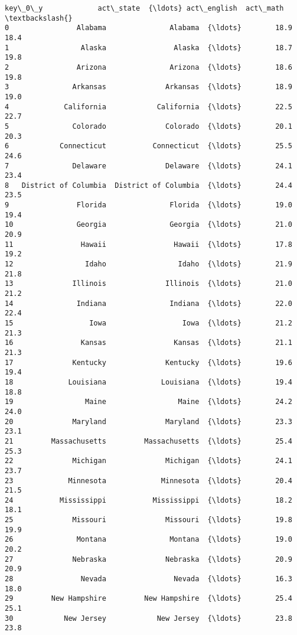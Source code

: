 \documentclass[11pt]{article}
\begin{document}
\begin{Verbatim}[commandchars=\\\{\}]
                 key\_0\_y             act\_state  {\ldots} act\_english  act\_math  \textbackslash{}
0                Alabama               Alabama  {\ldots}        18.9      18.4   
1                 Alaska                Alaska  {\ldots}        18.7      19.8   
2                Arizona               Arizona  {\ldots}        18.6      19.8   
3               Arkansas              Arkansas  {\ldots}        18.9      19.0   
4             California            California  {\ldots}        22.5      22.7   
5               Colorado              Colorado  {\ldots}        20.1      20.3   
6            Connecticut           Connecticut  {\ldots}        25.5      24.6   
7               Delaware              Delaware  {\ldots}        24.1      23.4   
8   District of Columbia  District of Columbia  {\ldots}        24.4      23.5   
9                Florida               Florida  {\ldots}        19.0      19.4   
10               Georgia               Georgia  {\ldots}        21.0      20.9   
11                Hawaii                Hawaii  {\ldots}        17.8      19.2   
12                 Idaho                 Idaho  {\ldots}        21.9      21.8   
13              Illinois              Illinois  {\ldots}        21.0      21.2   
14               Indiana               Indiana  {\ldots}        22.0      22.4   
15                  Iowa                  Iowa  {\ldots}        21.2      21.3   
16                Kansas                Kansas  {\ldots}        21.1      21.3   
17              Kentucky              Kentucky  {\ldots}        19.6      19.4   
18             Louisiana             Louisiana  {\ldots}        19.4      18.8   
19                 Maine                 Maine  {\ldots}        24.2      24.0   
20              Maryland              Maryland  {\ldots}        23.3      23.1   
21         Massachusetts         Massachusetts  {\ldots}        25.4      25.3   
22              Michigan              Michigan  {\ldots}        24.1      23.7   
23             Minnesota             Minnesota  {\ldots}        20.4      21.5   
24           Mississippi           Mississippi  {\ldots}        18.2      18.1   
25              Missouri              Missouri  {\ldots}        19.8      19.9   
26               Montana               Montana  {\ldots}        19.0      20.2   
27              Nebraska              Nebraska  {\ldots}        20.9      20.9   
28                Nevada                Nevada  {\ldots}        16.3      18.0   
29         New Hampshire         New Hampshire  {\ldots}        25.4      25.1   
30            New Jersey            New Jersey  {\ldots}        23.8      23.8   

\end{Verbatim}
\end{document}
